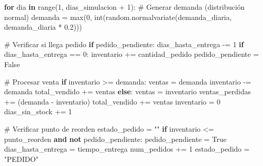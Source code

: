 \documentclass[
  doc,
  floatsintext,
  longtable,
  a4paper,
  nolmodern,
  notxfonts,
  notimes,
  12pt,
  colorlinks=true,linkcolor=blue,citecolor=blue,urlcolor=blue]{apa7}
\newenvironment{Shaded}{\begin{snugshade}}{\end{snugshade}}
\newcommand{\BuiltInTok}[1]{\textcolor[rgb]{0.00,0.23,0.31}{#1}}
\newcommand{\CommentTok}[1]{\textcolor[rgb]{0.37,0.37,0.37}{#1}}
\newcommand{\ControlFlowTok}[1]{\textcolor[rgb]{0.00,0.23,0.31}{\textbf{#1}}}
\newcommand{\DecValTok}[1]{\textcolor[rgb]{0.68,0.00,0.00}{#1}}
\newcommand{\FloatTok}[1]{\textcolor[rgb]{0.68,0.00,0.00}{#1}}
\newcommand{\KeywordTok}[1]{\textcolor[rgb]{0.00,0.23,0.31}{\textbf{#1}}}
\newcommand{\NormalTok}[1]{\textcolor[rgb]{0.00,0.23,0.31}{#1}}
\newcommand{\OperatorTok}[1]{\textcolor[rgb]{0.37,0.37,0.37}{#1}}
\newcommand{\StringTok}[1]{\textcolor[rgb]{0.13,0.47,0.30}{#1}}
\newcommand{\VariableTok}[1]{\textcolor[rgb]{0.07,0.07,0.07}{#1}}
\begin{document}
\begin{Shaded}
\begin{Highlighting}[]
    \ControlFlowTok{for}\NormalTok{ dia }\KeywordTok{in} \BuiltInTok{range}\NormalTok{(}\DecValTok{1}\NormalTok{, dias\_simulacion }\OperatorTok{+} \DecValTok{1}\NormalTok{):}
        \CommentTok{\# Generar demanda (distribución normal)}
\NormalTok{        demanda }\OperatorTok{=} \BuiltInTok{max}\NormalTok{(}\DecValTok{0}\NormalTok{, }\BuiltInTok{int}\NormalTok{(random.normalvariate(demanda\_diaria, demanda\_diaria }\OperatorTok{*} \FloatTok{0.2}\NormalTok{)))}
        
        \CommentTok{\# Verificar si llega pedido}
        \ControlFlowTok{if}\NormalTok{ pedido\_pendiente:}
\NormalTok{            dias\_hasta\_entrega }\OperatorTok{{-}=} \DecValTok{1}
            \ControlFlowTok{if}\NormalTok{ dias\_hasta\_entrega }\OperatorTok{==} \DecValTok{0}\NormalTok{:}
\NormalTok{                inventario }\OperatorTok{+=}\NormalTok{ cantidad\_pedido}
\NormalTok{                pedido\_pendiente }\OperatorTok{=} \VariableTok{False}
        
        \CommentTok{\# Procesar venta}
        \ControlFlowTok{if}\NormalTok{ inventario }\OperatorTok{\textgreater{}=}\NormalTok{ demanda:}
\NormalTok{            ventas }\OperatorTok{=}\NormalTok{ demanda}
\NormalTok{            inventario }\OperatorTok{{-}=}\NormalTok{ demanda}
\NormalTok{            total\_vendido }\OperatorTok{+=}\NormalTok{ ventas}
        \ControlFlowTok{else}\NormalTok{:}
\NormalTok{            ventas }\OperatorTok{=}\NormalTok{ inventario}
\NormalTok{            ventas\_perdidas }\OperatorTok{+=}\NormalTok{ (demanda }\OperatorTok{{-}}\NormalTok{ inventario)}
\NormalTok{            total\_vendido }\OperatorTok{+=}\NormalTok{ ventas}
\NormalTok{            inventario }\OperatorTok{=} \DecValTok{0}
\NormalTok{            dias\_sin\_stock }\OperatorTok{+=} \DecValTok{1}
        
        \CommentTok{\# Verificar punto de reorden}
\NormalTok{        estado\_pedido }\OperatorTok{=} \StringTok{""}
        \ControlFlowTok{if}\NormalTok{ inventario }\OperatorTok{\textless{}=}\NormalTok{ punto\_reorden }\KeywordTok{and} \KeywordTok{not}\NormalTok{ pedido\_pendiente:}
\NormalTok{            pedido\_pendiente }\OperatorTok{=} \VariableTok{True}
\NormalTok{            dias\_hasta\_entrega }\OperatorTok{=}\NormalTok{ tiempo\_entrega}
\NormalTok{            num\_pedidos }\OperatorTok{+=} \DecValTok{1}
\NormalTok{            estado\_pedido }\OperatorTok{=} \StringTok{"PEDIDO"}
        

\end{Highlighting}
\end{Shaded}
\end{document}
